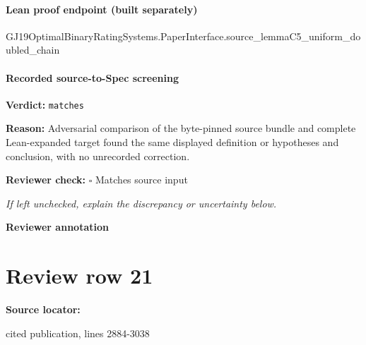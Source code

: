 \documentclass[10pt]{article}
\newcommand{\reviewerbox}{%
  \par\noindent\fbox{\parbox{0.96\linewidth}{\rule{0pt}{0.38in}}}\par
}
\newcommand{\reviewmatch}[1]{%
  \par\noindent\textbf{Reviewer check:} $\square$\; #1\par
  \noindent\emph{If left unchecked, explain the discrepancy or uncertainty below.}\par
}
\begin{document}
\paragraph{Lean proof endpoint (built separately)}\begin{ReviewVerbatim}
GJ19OptimalBinaryRatingSystems.PaperInterface.source_lemmaC5_uniform_doubled_chain
\end{ReviewVerbatim}

\paragraph{Recorded source-to-Spec screening}
\textbf{Verdict:} \texttt{matches}
\\
{\raggedright
\textbf{Reason:} Adversarial comparison of the byte-\allowbreak{}pinned source bundle and complete Lean-\allowbreak{}expanded target found the same displayed definition or hypotheses and conclusion, with no unrecorded correction.\allowbreak{}
\par}
\reviewmatch{Matches source input}
\noindent\textbf{Reviewer annotation}\par
\reviewerbox
\clearpage
\hypertarget{source-claim-428f19cd38ba7b0a}{}
\section*{Review row 21}
\textbf{Source locator:} {\footnotesize\raggedright cited publication, lines 2884-\allowbreak{}3038\par}
\end{document}
